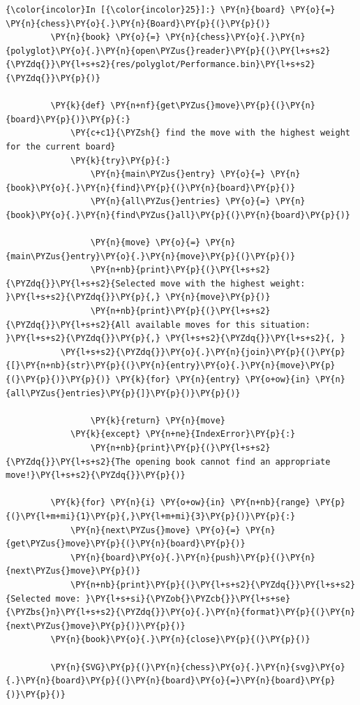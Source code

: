     \begin{Verbatim}[commandchars=\\\{\}]
{\color{incolor}In [{\color{incolor}25}]:} \PY{n}{board} \PY{o}{=} \PY{n}{chess}\PY{o}{.}\PY{n}{Board}\PY{p}{(}\PY{p}{)}
         \PY{n}{book} \PY{o}{=} \PY{n}{chess}\PY{o}{.}\PY{n}{polyglot}\PY{o}{.}\PY{n}{open\PYZus{}reader}\PY{p}{(}\PY{l+s+s2}{\PYZdq{}}\PY{l+s+s2}{res/polyglot/Performance.bin}\PY{l+s+s2}{\PYZdq{}}\PY{p}{)}
         
         \PY{k}{def} \PY{n+nf}{get\PYZus{}move}\PY{p}{(}\PY{n}{board}\PY{p}{)}\PY{p}{:}
             \PY{c+c1}{\PYZsh{} find the move with the highest weight for the current board}
             \PY{k}{try}\PY{p}{:}
                 \PY{n}{main\PYZus{}entry} \PY{o}{=} \PY{n}{book}\PY{o}{.}\PY{n}{find}\PY{p}{(}\PY{n}{board}\PY{p}{)}
                 \PY{n}{all\PYZus{}entries} \PY{o}{=} \PY{n}{book}\PY{o}{.}\PY{n}{find\PYZus{}all}\PY{p}{(}\PY{n}{board}\PY{p}{)}
         
                 \PY{n}{move} \PY{o}{=} \PY{n}{main\PYZus{}entry}\PY{o}{.}\PY{n}{move}\PY{p}{(}\PY{p}{)}
                 \PY{n+nb}{print}\PY{p}{(}\PY{l+s+s2}{\PYZdq{}}\PY{l+s+s2}{Selected move with the highest weight: }\PY{l+s+s2}{\PYZdq{}}\PY{p}{,} \PY{n}{move}\PY{p}{)}
                 \PY{n+nb}{print}\PY{p}{(}\PY{l+s+s2}{\PYZdq{}}\PY{l+s+s2}{All available moves for this situation: }\PY{l+s+s2}{\PYZdq{}}\PY{p}{,} \PY{l+s+s2}{\PYZdq{}}\PY{l+s+s2}{, }
		   \PY{l+s+s2}{\PYZdq{}}\PY{o}{.}\PY{n}{join}\PY{p}{(}\PY{p}{[}\PY{n+nb}{str}\PY{p}{(}\PY{n}{entry}\PY{o}{.}\PY{n}{move}\PY{p}{(}\PY{p}{)}\PY{p}{)} \PY{k}{for} \PY{n}{entry} \PY{o+ow}{in} \PY{n}{all\PYZus{}entries}\PY{p}{]}\PY{p}{)}\PY{p}{)}
         
                 \PY{k}{return} \PY{n}{move}
             \PY{k}{except} \PY{n+ne}{IndexError}\PY{p}{:}
                 \PY{n+nb}{print}\PY{p}{(}\PY{l+s+s2}{\PYZdq{}}\PY{l+s+s2}{The opening book cannot find an appropriate move!}\PY{l+s+s2}{\PYZdq{}}\PY{p}{)}
         
         \PY{k}{for} \PY{n}{i} \PY{o+ow}{in} \PY{n+nb}{range} \PY{p}{(}\PY{l+m+mi}{1}\PY{p}{,}\PY{l+m+mi}{3}\PY{p}{)}\PY{p}{:}
             \PY{n}{next\PYZus{}move} \PY{o}{=} \PY{n}{get\PYZus{}move}\PY{p}{(}\PY{n}{board}\PY{p}{)}
             \PY{n}{board}\PY{o}{.}\PY{n}{push}\PY{p}{(}\PY{n}{next\PYZus{}move}\PY{p}{)}
             \PY{n+nb}{print}\PY{p}{(}\PY{l+s+s2}{\PYZdq{}}\PY{l+s+s2}{Selected move: }\PY{l+s+si}{\PYZob{}\PYZcb{}}\PY{l+s+se}{\PYZbs{}n}\PY{l+s+s2}{\PYZdq{}}\PY{o}{.}\PY{n}{format}\PY{p}{(}\PY{n}{next\PYZus{}move}\PY{p}{)}\PY{p}{)}
         \PY{n}{book}\PY{o}{.}\PY{n}{close}\PY{p}{(}\PY{p}{)}
         
         \PY{n}{SVG}\PY{p}{(}\PY{n}{chess}\PY{o}{.}\PY{n}{svg}\PY{o}{.}\PY{n}{board}\PY{p}{(}\PY{n}{board}\PY{o}{=}\PY{n}{board}\PY{p}{)}\PY{p}{)}
\end{Verbatim}


